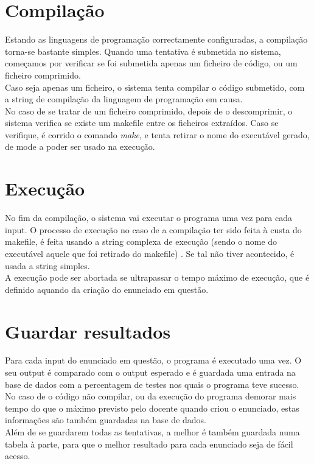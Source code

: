 \section{Compilação}\label{sec comp}

Estando as linguagens de programação correctamente configuradas, a compilação torna-se bastante simples. Quando uma tentativa
é submetida no sistema, começamos por verificar se foi submetida apenas um ficheiro de código, ou um ficheiro comprimido.\\
Caso seja apenas um ficheiro, o sistema tenta compilar o código submetido, com a string de compilação da linguagem de programação em causa.\\
No caso de se tratar de um ficheiro comprimido, depois de o descomprimir, o sistema verifica se existe um makefile entre os ficheiros extraídos. Caso se verifique, é corrido o comando \textit{make}, e tenta retirar o nome do executável gerado, de mode a poder
ser usado na execução.

\section{Execução}\label{sec exec}
No fim da compilação, o sistema vai executar o programa uma vez para cada input. O processo de execução no caso de a compilação ter
sido feita à custa do makefile, é feita usando a string complexa de execução (sendo o nome do executável aquele que foi retirado do
makefile) . Se tal não tiver acontecido, é usada a string simples.\\
A execução pode ser abortada se ultrapassar o tempo máximo de execução, que é definido aquando da criação do enunciado em
questão.

\section{Guardar resultados}\label{sec res}
Para cada input do enunciado em questão, o programa é executado uma vez. O seu output é comparado com o output esperado e 
é guardada uma entrada na base de dados com a percentagem de testes nos quais o programa teve sucesso.\\
No caso de o código não compilar, ou da execução do programa demorar mais tempo do que o máximo previsto pelo docente quando 
criou o enunciado, estas informações são também guardadas na base de dados.\\
Além de se guardarem todas as tentativas, a melhor é também guardada numa tabela à parte, para que o melhor resultado para cada
enunciado seja de fácil acesso.

